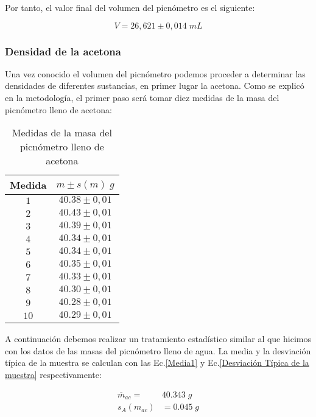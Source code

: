 \documentclass[a4paper,12pt,titlepage]{article}
\begin{document}
Por tanto, el valor final del volumen del picnómetro es el siguiente:

\begin{equation}
    V = 26,621 \pm 0,014 \; mL
\end{equation}

\subsubsection{Densidad de la acetona}

Una vez conocido el volumen del picnómetro podemos proceder a determinar las densidades de diferentes sustancias, en primer lugar la acetona. Como se explicó en la metodología, el primer paso será tomar diez medidas de la masa del picnómetro lleno de acetona:

\begin{table}[h!]
    \centering
    \begin{tabular}{|c|c|}
    \hline
    Medida & $m \pm s(m) \; g$\\ \hline
    $1$    & $40.38\pm 0,01$ \\ \hline
    $2$    & $40.43\pm 0,01$ \\ \hline
    $3$    & $40.39\pm 0,01$ \\ \hline
    $4$    & $40.34\pm 0,01$ \\ \hline
    $5$    & $40.34\pm 0,01$ \\ \hline
    $6$    & $40.35\pm 0,01$ \\ \hline
    $7$    & $40.33\pm 0,01$ \\ \hline
    $8$    & $40.30\pm 0,01$ \\ \hline
    $9$    & $40.28\pm 0,01$ \\ \hline
    $10$   & $40.29\pm 0,01$ \\ \hline
    \end{tabular}
    \caption{Medidas de la masa del picnómetro lleno de acetona}
    \label{Masas Acetona}
    \end{table}

A continuación debemos realizar un tratamiento estadístico similar al que hicimos con los datos de las masas del picnómetro lleno de agua. La media y la desviación típica de la muestra se calculan con las Ec.\ref{Media1} y Ec.\ref{Desviación Típica de la muestra} respectivamente:

\begin{align}
    \overline{m}_{ac} = &40.343 \; g    \\
    s_{A}(m_{ac}) &= 0.045 \; g
\end{align}
\end{document}
